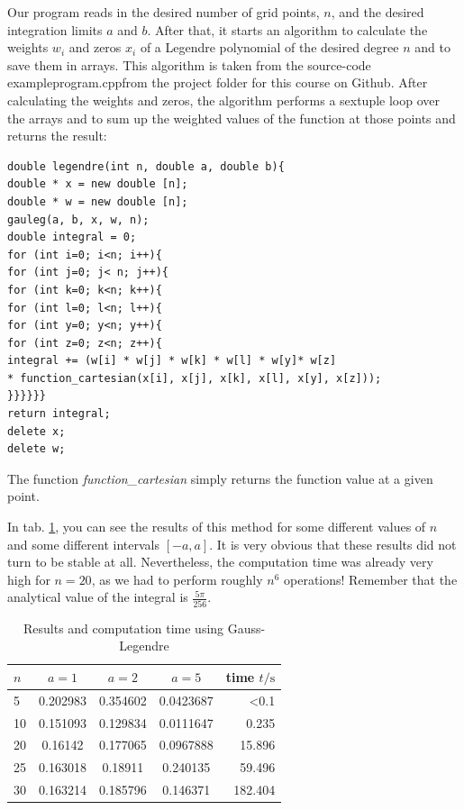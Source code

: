 \documentclass[10pt,a4paper]{article}
\begin{document}
Our program reads in the desired number of grid points, $n$, and the desired integration limits $a$ and $b$. After that, it starts an algorithm to calculate the weights $w_i$ and zeros $x_i$ of a Legendre polynomial of the desired degree $n$ and to save them in arrays. This algorithm is taken from the source-code \glqq exampleprogram.cpp\grqq from the project folder for this course on Github. After calculating the weights and zeros, the algorithm performs a sextuple loop over the arrays and to sum up the weighted values of the function at those points and returns the result:
\begin{lstlisting}
double legendre(int n, double a, double b){
double * x = new double [n];
double * w = new double [n];
gauleg(a, b, x, w, n);
double integral = 0;
for (int i=0; i<n; i++){
for (int j=0; j< n; j++){
for (int k=0; k<n; k++){
for (int l=0; l<n; l++){
for (int y=0; y<n; y++){
for (int z=0; z<n; z++){
integral += (w[i] * w[j] * w[k] * w[l] * w[y]* w[z]
* function_cartesian(x[i], x[j], x[k], x[l], x[y], x[z]));
}}}}}}
return integral;
delete x;
delete w;
\end{lstlisting}
The function \emph{function\_cartesian} simply returns the function value at a given point.

In tab. \ref{results_leg}, you can see the results of this method for some different values of $n$ and some different intervals $[-a,a]$. It is very obvious that these results did not turn to be stable at all. Nevertheless, the computation time was already very high for $n=20$, as we had to perform roughly $n^6$ operations! Remember that the analytical value of the integral is $\frac{5\pi}{256}$.
\begin{table}[h]
	\caption{Results and computation time using Gauss-Legendre\label{results_leg}}
	\centering
	\begin{tabular}{lcccr}
		$n$	&	$a=1$	&	$a=2$	&	$a=5$	&	time $t/\mathrm{s}$	\\\hline
		5	&	0.202983	&	0.354602	&	0.0423687	&	<0.1	\\
		10	&	0.151093	&	0.129834	&	0.0111647	&	0.235	\\
		20	&	0.16142	&	0.177065	&	0.0967888	&	15.896	\\
		25	&	0.163018	&	0.18911	&	0.240135	&	59.496	\\
		30	&	0.163214	&	0.185796	&	0.146371	&	182.404		
	\end{tabular}
\end{table}
\end{document}
